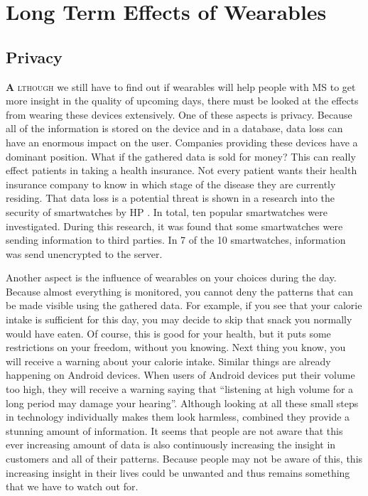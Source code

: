 \chapter{Long Term Effects of Wearables} \label{chapter: Long Term Effects}

\section{Privacy}
\lettrine[lhang = 0.4, findent=-60pt, lines=7]{\textbf{
		\initfamily \fontsize{40mm}{40mm} \selectfont A
		\normalfont}}{lthough}
we still have to find out if wearables will help people with MS to get more insight in the quality of upcoming days, there must be looked at the effects from wearing these devices extensively.
One of these aspects is privacy.
Because all of the information is stored on the device and in a database, data loss can have an enormous impact on the user. 
Companies providing these devices have a dominant position.
What if the gathered data is sold for money?
This can really effect patients in taking a health insurance.
Not every patient wants their health insurance company to know in which stage of the disease they are currently residing.
That data loss is a potential threat is shown in a research into the security of smartwatches by HP \cite{hp2015smartwatches}.
In total, ten popular smartwatches were investigated. 
During this research, it was found that some smartwatches were sending information to third parties.
In 7 of the 10 smartwatches, information was send unencrypted to the server.

Another aspect is the influence of wearables on your choices during the day.
Because almost everything is monitored, you cannot deny the patterns that can be made visible using the gathered data.
For example, if you see that your calorie intake is sufficient for this day, you may decide to skip that snack you normally would have eaten.
Of course, this is good for your health, but it puts some restrictions on your freedom, without you knowing.
Next thing you know, you will receive a warning about your calorie intake.
Similar things are already happening on Android devices.
When users of Android devices put their volume too high, they will receive a warning saying that ``listening at high volume for a long period may damage your hearing''.
Although looking at all these small steps in technology individually makes them look harmless, combined they provide a stunning amount of information. 
It seems that people are not aware that this ever increasing amount of data is also continuously increasing the insight in customers and all of their patterns. 
Because people may not be aware of this, this increasing insight in their lives could be unwanted and thus remains something that we have to watch out for.

